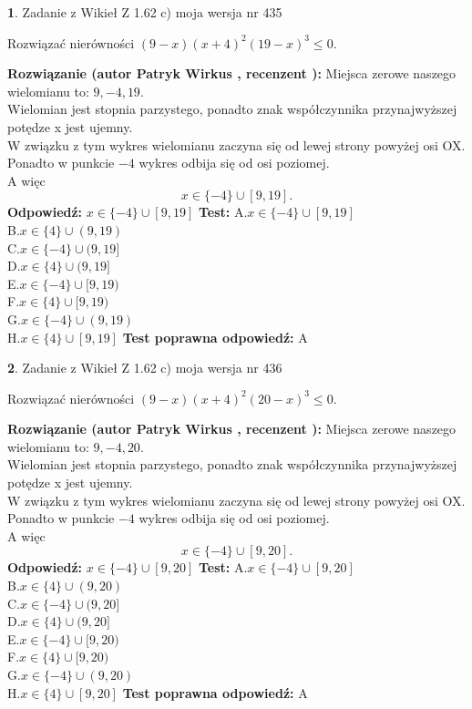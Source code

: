 \documentclass[12pt, a4paper]{article}
\theoremstyle{definition} %
\newtheorem{zad}{}
\newcommand{\zadStart}[1]{\begin{zad}#1\newline}
\newcommand{\zadStop}{\end{zad}}
\newcommand{\rozwStart}[2]{\noindent \textbf{Rozwiązanie (autor #1 , recenzent #2): }\newline}
\newcommand{\rozwStop}{\newline}
\newcommand{\odpStart}{\noindent \textbf{Odpowiedź:}\newline}
\newcommand{\odpStop}{\newline}
\newcommand{\testStart}{\noindent \textbf{Test:}\newline}
\newcommand{\testStop}{\newline}
\newcommand{\kluczStart}{\noindent \textbf{Test poprawna odpowiedź:}\newline}
\newcommand{\kluczStop}{\newline}
\begin{document}
\zadStart{Zadanie z Wikieł Z 1.62 c) moja wersja nr 435}

Rozwiązać nierówności $(9-x)(x+4)^{2}(19-x)^{3}\le0$.
\zadStop
\rozwStart{Patryk Wirkus}{}
Miejsca zerowe naszego wielomianu to: $9, -4, 19$.\\
Wielomian jest stopnia parzystego, ponadto znak współczynnika przy\linebreak najwyższej potędze x jest ujemny.\\ W związku z tym wykres wielomianu zaczyna się od lewej strony powyżej osi OX.\\
Ponadto w punkcie $-4$ wykres odbija się od osi poziomej.\\
A więc $$x \in \{-4\} \cup [9,19].$$
\rozwStop
\odpStart
$x \in \{-4\} \cup [9,19]$
\odpStop
\testStart
A.$x \in \{-4\} \cup [9,19]$\\
B.$x \in \{4\} \cup (9,19)$\\
C.$x \in \{-4\} \cup (9,19]$\\
D.$x \in \{4\} \cup (9,19]$\\
E.$x \in \{-4\} \cup [9,19)$\\
F.$x \in \{4\} \cup [9,19)$\\
G.$x \in \{-4\} \cup (9,19)$\\
H.$x \in \{4\} \cup [9,19]$
\testStop
\kluczStart
A
\kluczStop



\zadStart{Zadanie z Wikieł Z 1.62 c) moja wersja nr 436}

Rozwiązać nierówności $(9-x)(x+4)^{2}(20-x)^{3}\le0$.
\zadStop
\rozwStart{Patryk Wirkus}{}
Miejsca zerowe naszego wielomianu to: $9, -4, 20$.\\
Wielomian jest stopnia parzystego, ponadto znak współczynnika przy\linebreak najwyższej potędze x jest ujemny.\\ W związku z tym wykres wielomianu zaczyna się od lewej strony powyżej osi OX.\\
Ponadto w punkcie $-4$ wykres odbija się od osi poziomej.\\
A więc $$x \in \{-4\} \cup [9,20].$$
\rozwStop
\odpStart
$x \in \{-4\} \cup [9,20]$
\odpStop
\testStart
A.$x \in \{-4\} \cup [9,20]$\\
B.$x \in \{4\} \cup (9,20)$\\
C.$x \in \{-4\} \cup (9,20]$\\
D.$x \in \{4\} \cup (9,20]$\\
E.$x \in \{-4\} \cup [9,20)$\\
F.$x \in \{4\} \cup [9,20)$\\
G.$x \in \{-4\} \cup (9,20)$\\
H.$x \in \{4\} \cup [9,20]$
\testStop
\kluczStart
A
\kluczStop
\end{document}
